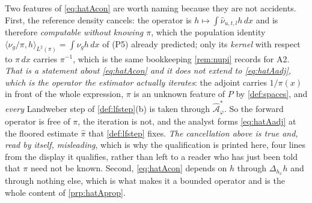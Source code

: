 \begin{definition}
Two features of \eqref{eq:hatAcon} are worth naming because they are not accidents. First, the
reference density cancels: the operator is $h\mapsto\int\hat\nu_{u,t,l}h\,dx$ and is therefore
\emph{computable without knowing $\pi$}, which the population identity
$\langle\nu_g/\pi,h\rangle_{L^{2}(\pi)}=\int\nu_gh\,dx$ of (P5) already predicted; only its
\emph{kernel} with respect to $\pi\,dx$ carries $\pi^{-1}$, which is the same bookkeeping
\cref{rem:nupi} records for A2. \emph{That is a statement about \eqref{eq:hatAcon} and it does not
extend to \eqref{eq:hatAadj}, which is the operator the estimator actually iterates}: the adjoint
carries $1/\pi(x)$ in front of the whole expression, $\pi$ is an unknown feature of $P$ by
\cref{def:spaces}, and \emph{every} Landweber step of \cref{def:lfstep}\textup{(b)} is taken through
$\hat{\mathcal A}^\ast_\varphi$. So the forward operator is free of $\pi$, the iteration is not, and the
analyst forms \eqref{eq:hatAadj} at the floored estimate $\hat\pi$ that \cref{def:lfstep} fixes.
\emph{The cancellation above is true and, read by itself, misleading}, which is why the qualification is
printed here, four lines from the display it qualifies, rather than left to a reader who has just been
told that $\pi$ need not be known.
Second, \eqref{eq:hatAcon} depends on $h$ through
$\Delta_{h_x}h$ and through nothing else, which is what makes it a bounded operator and is the whole
content of \cref{prp:hatAprop}.
\end{definition}

